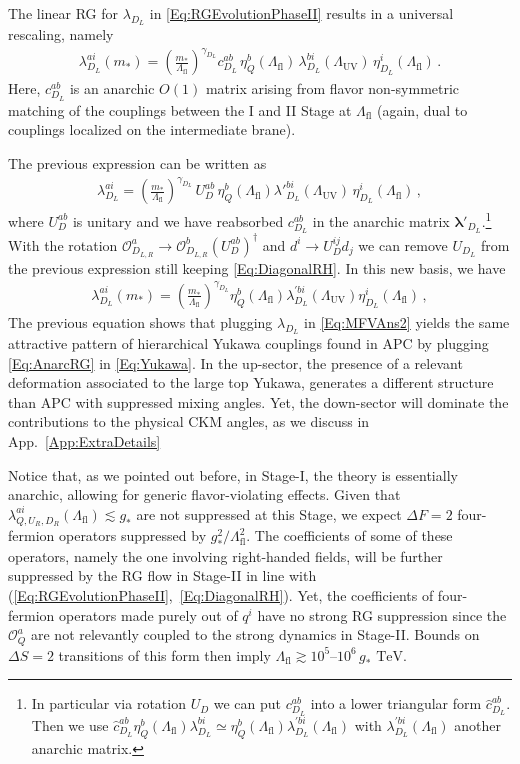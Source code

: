 \documentclass[aps,prl,twocolumn,showpacs,10pt,preprintnumbers,nofootinbib]{revtex4-2}
\newcommand{\TeV}{\,\mathrm{TeV}}
\newcommand{\gst}{g_*}
\newcommand{\mst}{m_*}
\newcommand{\Lfl}{\Lambda_{\text{fl}}}
\newcommand{\LUV}{\Lambda_{\text{UV}}}
\newcommand{\op}{\mathcal{O}}
\begin{document}
{The linear RG for $\lambda_{D_L}$ in \eqref{Eq:RGEvolutionPhaseII} results in a universal rescaling, namely
\begin{align}\label{Eq:LHMixmst}
    \lambda^{ai}_{D_L}(\mst) = \left(\frac{\mst}{\Lfl} \right)^{\gamma_{D_L}} c^{ab}_{D_L} \, \eta^b_{Q}(\Lfl) \, \lambda^{bi}_{D_L}(\LUV) \, \eta^i_{D_L} (\Lfl)\,.
\end{align}
Here, $c^{ab}_{D_L}$ is an anarchic $O(1)$ matrix arising from flavor non-symmetric matching of the couplings between the I and II Stage at $\Lfl$ (again, dual to couplings localized on the intermediate brane). 

The previous expression can be written as
\begin{align}
    \lambda_{D_L}^{ai}= \left(\frac{\mst}{\Lfl} \right)^{\gamma_{D_L}}  \,U_{D}^{ab}\, \eta^b_{Q} (\Lfl) \lambda'^{bi}_{D_L}(\LUV) \, \eta^i_{D_L}(\Lfl) \,,
\end{align}
where $U_{D}^{ab}$ is unitary and we have reabsorbed $c_{D_L}^{ab}$ in the anarchic matrix $\boldsymbol{\lambda}'_{D_L}$.\footnote{In particular via rotation $U_D$ we can put $c^{ab}_{D_L}$ into a lower triangular form $\hat{c}_{D_L}^{ab}$. Then we use $\hat{c}_{D_L}^{ab}\eta_{Q}^b(\Lfl) \lambda_{D_L}^{bi}\simeq \eta_Q^b(\Lfl)\lambda^{'bi}_{D_L}(\Lfl)$ with $\lambda^{'bi}_{D_L}(\Lfl)$ another anarchic matrix.} With the rotation $\op_{D_{L,R}}^a\rightarrow \op_{D_{L,R}}^b (U_D^{ab})^{\dagger}$ and $d^i \rightarrow U_D^{ij}d_j$ we can remove $U_{D_L}$ from the previous expression still keeping \eqref{Eq:DiagonalRH}. In this new basis, we have
\begin{align}\label{Eq:MixIRDown}
    \lambda^{ai}_{D_L}(\mst) = \left(\frac{\mst}{\Lfl} \right)^{\gamma_{D_L}}\eta^b_{Q}(\Lfl){\lambda}^{'bi}_{D_L}(\LUV)\eta^i_{D_L}(\Lfl) \,,
\end{align}
The previous equation shows that plugging $\lambda_{D_L}$ in \eqref{Eq:MFVAns2} yields the same attractive pattern of hierarchical Yukawa couplings found in APC by plugging \eqref{Eq:AnarcRG} in \eqref{Eq:Yukawa}. In the up-sector, the presence of a relevant deformation associated to the large top Yukawa, generates a different structure than APC with suppressed mixing angles. Yet, the down-sector will dominate the contributions to the physical CKM angles, as we discuss in App.~\ref{App:ExtraDetails}

Notice that, as we pointed out before, in Stage-I, the theory is essentially anarchic, allowing for generic flavor-violating effects. Given that $\lambda_{Q, U_R, D_R}^{ai} (\Lfl)\lesssim \gst$ are not suppressed at this Stage, we expect $\Delta F = 2$ four-fermion operators suppressed by $\gst^2/\Lfl^2$. The coefficients of some of these operators, namely the one involving right-handed fields, will be further suppressed by the RG flow in Stage-II in line with (\ref{Eq:RGEvolutionPhaseII},~\ref{Eq:DiagonalRH}). Yet, the coefficients of four-fermion operators made purely out of $q^i$ have no strong RG suppression since the $\op_Q^a$ are not relevantly coupled to the strong dynamics in Stage-II. Bounds on $\Delta S = 2$ transitions \cite{Bona:2024bue} of this form then imply $\Lfl \gtrsim 10^5\text{--}10^6 \,\gst\, \TeV$.

}
\end{document}
